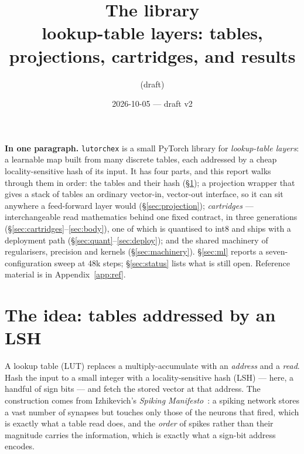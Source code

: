 \documentclass[11pt]{article}
\title{\textbf{The \code{lutorch\_ex} library}\\[2pt]\large lookup-table layers: tables, projections, cartridges, and results}
\author{(draft)}
\date{2026-10-05 --- draft v2}
\DeclareRobustCommand{\code}[1]{{\renewcommand{\_}{\textunderscore\allowbreak}\texttt{#1}}}
\begin{document}
\maketitle
\vspace{-1.2em}

\noindent\textbf{In one paragraph.} \code{lutorch\_ex} is a small PyTorch library for \emph{lookup-table layers}: a
learnable map built from many discrete tables, each addressed by a cheap locality-sensitive hash of its
input. It has four parts, and this report walks through them in order: the tables and their hash
(\S\ref{sec:idea}); a projection wrapper that gives a stack of tables an ordinary vector-in, vector-out
interface, so it can sit anywhere a feed-forward layer would (\S\ref{sec:projection}); \emph{cartridges}
--- interchangeable read mathematics behind
one fixed contract, in three generations (\S\ref{sec:cartridges}--\ref{sec:body}), one of which is
quantised to int8 and ships with a deployment path (\S\ref{sec:quant}--\ref{sec:deploy}); and the shared
machinery of regularisers, precision and kernels (\S\ref{sec:machinery}). \S\ref{sec:ml} reports a
seven-configuration sweep at 48k steps; \S\ref{sec:status} lists what is still open. Reference material
is in Appendix~\ref{app:ref}.

\section{The idea: tables addressed by an LSH}
\label{sec:idea}

A lookup table (LUT) replaces a multiply-accumulate with an \emph{address} and a \emph{read}. Hash the
input to a small integer with a locality-sensitive hash (LSH) --- here, a handful of sign bits --- and
fetch the stored vector at that address. The construction comes from Izhikevich's \emph{Spiking
Manifesto}~\citep{manifesto}: a spiking network stores a vast number of synapses but touches only those of
the neurons that fired, which is exactly what a table read does, and the \emph{order} of spikes rather than
their magnitude carries the information, which is exactly what a sign-bit address encodes.
\end{document}
